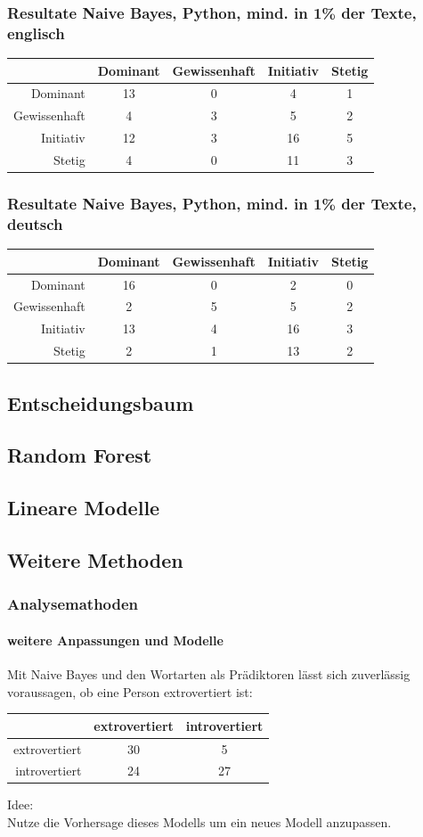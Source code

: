 \documentclass{beamer}
\begin{document}
\begin{frame}
\frametitle{Resultate Naive Bayes, Python, mind. in 1\% der Texte, englisch}
 \begin{tabular}{r|c|c|c|c|}
                &  Dominant  & Gewissenhaft & Initiativ & Stetig\\
 \hline
  Dominant      & 13 & 0 & 4 & 1 \\
  Gewissenhaft  & 4 & 3 & 5 & 2\\
  Initiativ     & 12 & 3 & 16 & 5\\
  Stetig        & 4 & 0 & 11 & 3
 \end{tabular}
\end{frame}

\begin{frame}
\frametitle{Resultate Naive Bayes, Python, mind. in 1\% der Texte, deutsch}
\begin{tabular}{r|c|c|c|c|}
 &  Dominant  & Gewissenhaft & Initiativ & Stetig\\
\hline
Dominant & 16 & 0 & 2 & 0 \\
Gewissenhaft & 2 & 5 & 5 & 2\\
Initiativ & 13 & 4 & 16 & 3\\
Stetig & 2 & 1 & 13 & 2
\end{tabular}
\end{frame}

\subsection{Entscheidungsbaum}
\subsection{Random Forest}
\subsection{Lineare Modelle}

\subsection{Weitere Methoden}
\begin{frame}
 \frametitle{Analysemathoden}
 \framesubtitle{weitere Anpassungen und Modelle}
 Mit Naive Bayes und den Wortarten als Prädiktoren lässt sich zuverlässig voraussagen,
 ob eine Person extrovertiert ist:\\
 \vspace{12pt}
 \begin{center}
 \begin{tabular}{r|c|c|}
  &  extrovertiert  & introvertiert \\
  \hline
  extrovertiert & 30 & 5  \\
  introvertiert & 24 & 27 \\
 \end{tabular} 
 \end{center}

 \vspace{12pt}
 
 Idee:\\
 Nutze die Vorhersage dieses Modells um ein neues Modell anzupassen.
\end{frame}
\end{document}

